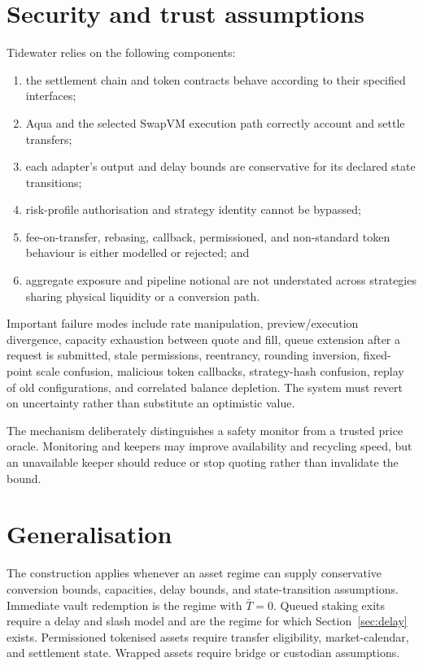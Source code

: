 \documentclass[10pt,twocolumn]{article}
\theoremstyle{definition}
\begin{document}
\section{Security and trust assumptions}

Tidewater relies on the following components:

\begin{enumerate}[label=\arabic*.]
  \item the settlement chain and token contracts behave according to their specified interfaces;
  \item Aqua and the selected SwapVM execution path correctly account and settle transfers;
  \item each adapter's output and delay bounds are conservative for its declared state transitions;
  \item risk-profile authorisation and strategy identity cannot be bypassed;
  \item fee-on-transfer, rebasing, callback, permissioned, and non-standard token behaviour is either modelled or
        rejected; and
  \item aggregate exposure and pipeline notional are not understated across strategies sharing physical liquidity
        or a conversion path.
\end{enumerate}

Important failure modes include rate manipulation, preview/execution divergence, capacity exhaustion between quote
and fill, queue extension after a request is submitted, stale permissions, reentrancy, rounding inversion,
fixed-point scale confusion, malicious token callbacks, strategy-hash confusion, replay of old configurations, and
correlated balance depletion. The system must revert on uncertainty rather than substitute an optimistic value.

The mechanism deliberately distinguishes a safety monitor from a trusted price oracle. Monitoring and keepers may
improve availability and recycling speed, but an unavailable keeper should reduce or stop quoting rather than
invalidate the bound.

\section{Generalisation}

The construction applies whenever an asset regime can supply conservative conversion bounds, capacities, delay
bounds, and state-transition assumptions. Immediate vault redemption is the regime with $\bar T = 0$. Queued
staking exits require a delay and slash model and are the regime for which Section~\ref{sec:delay} exists.
Permissioned tokenised assets require transfer eligibility, market-calendar, and settlement state. Wrapped assets
require bridge or custodian assumptions.
\end{document}

